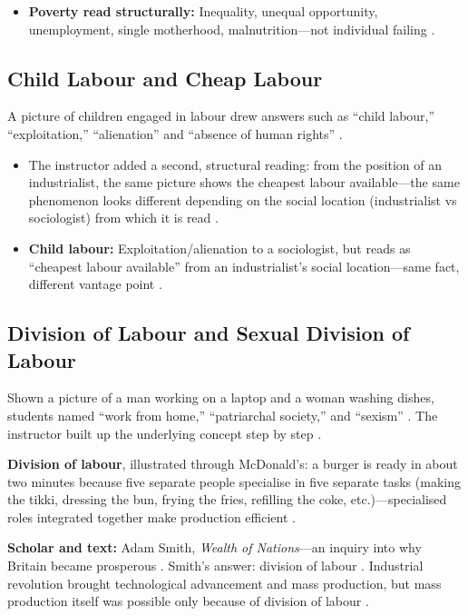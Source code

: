 \begin{QuickRevision}
\begin{itemize}
    \item \textbf{Poverty read structurally:} Inequality, unequal opportunity, unemployment, single motherhood, malnutrition---not individual failing .
\end{itemize}
\end{QuickRevision}

\subsection{Child Labour and Cheap Labour}
A picture of children engaged in labour drew answers such as ``child labour,'' ``exploitation,'' ``alienation'' and ``absence of human rights'' .

\begin{CriticalPoint}
\begin{itemize}
    \item The instructor added a second, structural reading: from the position of an industrialist, the same picture shows the cheapest labour available---the same phenomenon looks different depending on the social location (industrialist vs sociologist) from which it is read .
\end{itemize}
\end{CriticalPoint}

\begin{QuickRevision}
\begin{itemize}
    \item \textbf{Child labour:} Exploitation/alienation to a sociologist, but reads as ``cheapest labour available'' from an industrialist's social location---same fact, different vantage point .
\end{itemize}
\end{QuickRevision}

\subsection{Division of Labour and Sexual Division of Labour}
Shown a picture of a man working on a laptop and a woman washing dishes, students named ``work from home,'' ``patriarchal society,'' and ``sexism'' . The instructor built up the underlying concept step by step .

\begin{KeyConcept}
\textbf{Division of labour}, illustrated through McDonald's: a burger is ready in about two minutes because five separate people specialise in five separate tasks (making the tikki, dressing the bun, frying the fries, refilling the coke, etc.)---specialised roles integrated together make production efficient .

\textbf{Scholar and text:} Adam Smith, \textit{Wealth of Nations}---an inquiry into why Britain became prosperous . Smith's answer: division of labour . Industrial revolution brought technological advancement and mass production, but mass production itself was possible only because of division of labour .
\end{KeyConcept}

